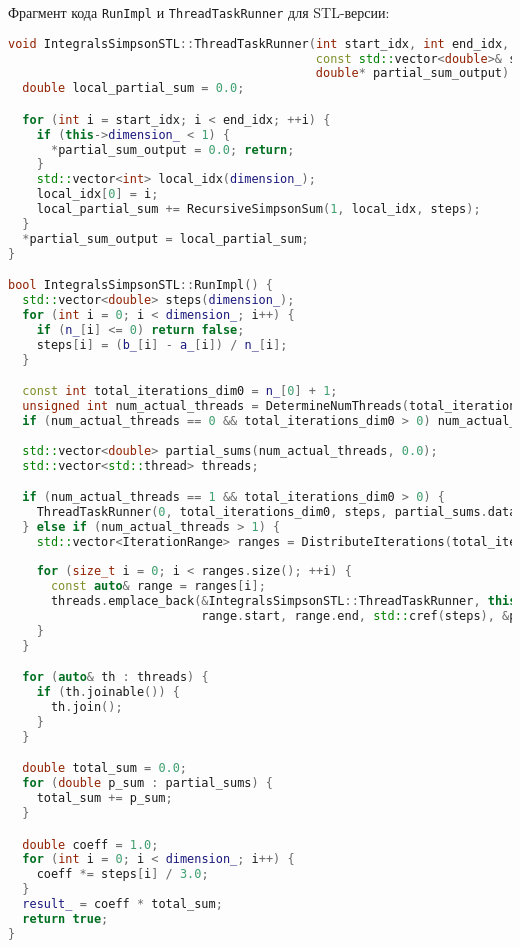 \documentclass[a4paper,12pt]{article}
\begin{document}
Фрагмент кода \texttt{RunImpl} и \texttt{ThreadTaskRunner} для STL-версии:
\begin{lstlisting}[language=C++, caption=Функция ThreadTaskRunner и фрагмент RunImpl для STL-реализации (ops\_stl.cpp), basicstyle=\ttfamily\scriptsize]
void IntegralsSimpsonSTL::ThreadTaskRunner(int start_idx, int end_idx, 
                                           const std::vector<double>& steps,
                                           double* partial_sum_output) {
  double local_partial_sum = 0.0;

  for (int i = start_idx; i < end_idx; ++i) {
    if (this->dimension_ < 1) {
      *partial_sum_output = 0.0; return;
    }
    std::vector<int> local_idx(dimension_);
    local_idx[0] = i;
    local_partial_sum += RecursiveSimpsonSum(1, local_idx, steps);
  }
  *partial_sum_output = local_partial_sum;
}

bool IntegralsSimpsonSTL::RunImpl() {
  std::vector<double> steps(dimension_);
  for (int i = 0; i < dimension_; i++) {
    if (n_[i] <= 0) return false;
    steps[i] = (b_[i] - a_[i]) / n_[i];
  }

  const int total_iterations_dim0 = n_[0] + 1;
  unsigned int num_actual_threads = DetermineNumThreads(total_iterations_dim0);
  if (num_actual_threads == 0 && total_iterations_dim0 > 0) num_actual_threads = 1;
  
  std::vector<double> partial_sums(num_actual_threads, 0.0);
  std::vector<std::thread> threads;

  if (num_actual_threads == 1 && total_iterations_dim0 > 0) {
    ThreadTaskRunner(0, total_iterations_dim0, steps, partial_sums.data());
  } else if (num_actual_threads > 1) {
    std::vector<IterationRange> ranges = DistributeIterations(total_iterations_dim0, num_actual_threads);
    
    for (size_t i = 0; i < ranges.size(); ++i) {
      const auto& range = ranges[i];
      threads.emplace_back(&IntegralsSimpsonSTL::ThreadTaskRunner, this, 
                           range.start, range.end, std::cref(steps), &partial_sums[i]);
    }
  }

  for (auto& th : threads) {
    if (th.joinable()) {
      th.join();
    }
  }

  double total_sum = 0.0;
  for (double p_sum : partial_sums) {
    total_sum += p_sum;
  }

  double coeff = 1.0;
  for (int i = 0; i < dimension_; i++) {
    coeff *= steps[i] / 3.0;
  }
  result_ = coeff * total_sum;
  return true;
}
\end{lstlisting}
\end{document}

